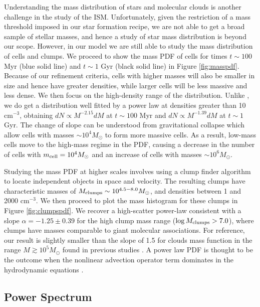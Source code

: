 \documentclass[twocolumn]{aastex}
\newcommand{\cmmm}{cm$^{-3}$}
\newcommand{\msun}{M_\odot}
\begin{document}
Understanding the mass distribution of stars and molecular clouds is another challenge in the study of the ISM. Unfortunately, given the restriction of a mass threshold imposed in our star formation recipe, we are not able to get a broad sample of stellar masses, and hence a study of star mass distribution is beyond our scope. However, in our model we are still able to study the mass distribution of cells and clumps. We proceed to show the mass PDF of cells for times $t \sim 100$ Myr (blue solid line) and $t \sim 1$ Gyr (black solid line) in Figure \ref{fig:masspdf}. Because of our refinement criteria, cells with higher masses will also be smaller in size and hence have greater densities, while larger cells will be less massive and less dense. We then focus on the high-density range of the distribution. Unlike \citet{Ballesteros_Paredes_06}, we do get a distribution well fitted by a power law at densities greater than 10 \cmmm, obtaining $dN \propto M^{-2.15}dM$ at $t \sim 100$ Myr and $dN \propto M^{-1.39}dM$ at $t \sim 1$ Gyr. The change of slope can be understood from gravitational collapse which allow cells with masses $\sim 10^4\msun$ to form more massive cells. As a result, low-mass cells move to the high-mass regime in the PDF, causing a decrease in the number of cells with $m_{\rm cell} = 10^4\msun$ and an increase of cells with masses $\sim 10^6\msun$.

Studying the mass PDF at higher scales involves using a clump finder algorithm to locate independent objects in space and velocity. The resulting clumps have characteristic masses of $M_{\rm clumps} \sim 10^{4.5-8.0} \msun$, and densities between 1 and 2000 \cmmm. We then proceed to plot the mass histogram for these clumps in Figure \ref{fig:clumpspdf}. We recover a high-scatter power-law consistent with a slope $\alpha = -1.25 \pm 0.39$ for the high clump mass range ($\log{M_{\rm clumps}} > 7.0$), where clumps have masses comparable to giant molecular associations. For reference, our result is slightly smaller than the slope of 1.5 for clouds mass function in the range $M \gtrsim 10^5 \msun$ found in previous studies \citep{Williams_97, Rosolowsky_05, Blitz_07, Padoan_07}. A power law PDF is thought to be the outcome when the nonlinear advection operator term dominates in the hydrodynamic equations \citep{Scalo_98a}.

\subsection{Power Spectrum}
\label{subsec:ps}
\end{document}
